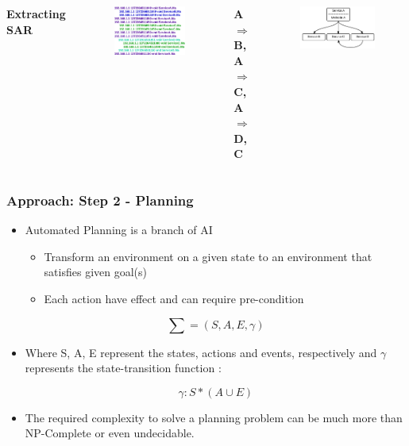 \documentclass{beamer}
\begin{document}
\begin{frame}
\begin{columns}[c]
\textbf{Extracting SAR \cite{p4}}
\begin{figure}
\includegraphics[width=0.6\linewidth]{media/SOMAD4-2.png}
\end{figure}
\begin{center}
\textbf{A $\Rightarrow$ B, A $\Rightarrow$ C, A $\Rightarrow$ D, C}\\
\end{center}
\begin{figure}
\vspace{-0.5cm}
\includegraphics[width=0.6\linewidth]{media/SOMAD4-3.png}
\end{figure}
\end{columns}
\end{frame}

\begin{frame}
\frametitle{Approach: Step 2 - Planning}
\begin{itemize}
\item Automated Planning is a branch of AI
\begin{itemize}
\item Transform an environment on a given state to an environment that satisfies given goal(s)
\item Each action have effect and can require pre-condition 
\end{itemize}
 
\begin{equation}
\sum  = (S, A, E, \gamma)
\end{equation}

\item Where S, A, E represent the states, actions and events, respectively and $\gamma$ represents the state-transition function :

\begin{equation}
\gamma: S * (A \cup E)
\end{equation}
\item The required complexity to solve a planning problem
can be much more than NP-Complete or even undecidable.
\end{itemize}
\end{frame}
\end{document}
